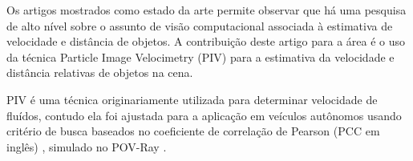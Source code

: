 Os artigos mostrados como estado da arte permite observar que há uma pesquisa de alto nível sobre o assunto de visão computacional associada à
estimativa de velocidade e distância de objetos. A contribuição deste artigo para a área é o uso da técnica Particle Image Velocimetry (PIV) 
para a estimativa da velocidade e distância relativas de objetos na cena.

PIV \cite{Bastiaans} é uma técnica originariamente utilizada para determinar velocidade de fluídos, contudo ela foi ajustada para a aplicação em
veículos autônomos usando critério de busca baseados no coeficiente de correlação de Pearson (PCC em inglês) \cite{Miranda Neto}, simulado 
no POV-Ray \cite{povray}.


















